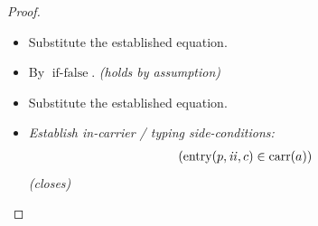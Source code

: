 \documentclass[11pt]{article}
\theoremstyle{plain}
\begin{document}
\begin{proof}
\begin{itemize}[leftmargin=2.8em, itemsep=4pt, parsep=1pt]
  \item[\textbf{74}] Substitute the established equation.
  \item[\textbf{75--76}] By $\operatorname{if\text{-}false}$.  \emph{(holds by assumption)}
  \item[\textbf{77}] Substitute the established equation.
  \item[\textbf{78--79}] \emph{Establish in-carrier / typing side-conditions:}
\begin{equation*}
\begin{array}{@{}l@{}}
(\operatorname{entry}(p, \mathit{ii}, c) \in \operatorname{carr}(a))
\end{array}
\end{equation*}
  \emph{(closes)}
\end{itemize}
\end{proof}
\end{document}
